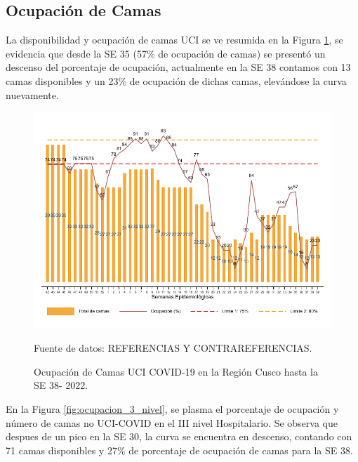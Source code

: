 \documentclass[12pt,a4paper,openany]{book}
\begin{document}
	\clearpage
	\subsection*{Ocupación de Camas}
	\noindent La disponibilidad y ocupación de camas UCI se ve resumida en la Figura \ref{fig:ocupacion_uci}, se evidencia que desde la SE 35 (57$\%$ de ocupación de camas) se presentó un descenso del porcentaje de ocupación, actualmente en la SE 38 contamos con 13 camas disponibles y un 23$\%$ de ocupación de dichas camas, elevándose la curva nuevamente.
	
	\begin{figure}[h]
		\caption{Ocupación de Camas UCI COVID-19 en la Región Cusco hasta la SE 38- 2022.}\label{fig:ocupacion_uci}
		\begin{center}
			\includegraphics[width=0.95\linewidth]{../figuras/uci.pdf}
		\end{center}
		{\footnotesize {Fuente de datos: REFERENCIAS Y CONTRAREFERENCIAS.}}
	\end{figure}
	\cleardoublepage
	
	En la Figura \ref{fig:ocupacion_3_nivel}, se plasma el porcentaje de ocupación y número de camas no UCI-COVID en el III nivel Hospitalario. Se observa que despues de un pico en la SE 30, la curva se encuentra en descenso, contando con 71 camas disponibles y 27$\%$ de porcentaje de ocupación de camas para la SE 38.
	
\end{document}
